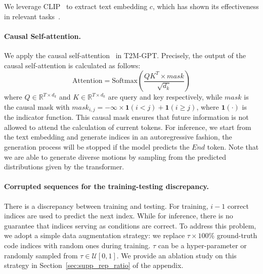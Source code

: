 \documentclass[10pt,twocolumn,letterpaper]{article}
\begin{document}
We leverage CLIP~\cite{radford2021learning} to extract text embedding $c$, which has shown its effectiveness in relevant tasks~\cite{tevet2022motionclip,ramesh2022hierarchical,crowson2022vqgan}. 

\paragraph{Causal Self-attention.} We apply the causal self-attention~\cite{radford2018improving} in T2M-GPT. Precisely, the output of the causal self-attention is calculated as follows:
\begin{equation}
	\text{Attention} = \text{Softmax} \left( \frac{QK^T \times mask}{\sqrt{d_k}} \right)
	\label{formula:causal}
\end{equation}
where $Q \in \mathbb{R}^{T \times d_k}$ and $K \in \mathbb{R}^{T \times d_k}$ are query and key respectively, while $mask$ is the causal mask with $mask_{i,j} = -\infty \times \mathbf{1}\left( i < j\right) + \mathbf{1}\left( i \geq j \right)$, where $\mathbf{1}(\cdot)$ is the indicator function.
This causal mask ensures that future information is not allowed to attend the calculation of current tokens. For inference, we start from the text embedding and generate indices in an autoregressive fashion, the generation process will be stopped if the model predicts the $\mathit{End}$ token. Note that we are able to generate diverse motions by sampling from the predicted distributions given by the transformer.

\paragraph{Corrupted sequences for the training-testing discrepancy.} There is a discrepancy between training and testing. For training, $i-1$ correct indices are used to predict the next index. While for inference, there is no guarantee that indices serving as conditions are correct. To address this problem, we adopt a simple data augmentation strategy:  we replace $\tau\times100\%$ ground-truth code indices with random ones during training. $\tau$ can be a hyper-parameter or randomly sampled from $\tau \in \mathcal{U}[0, 1]$. We provide an ablation study on this strategy in Section~\ref{sec:supp_rep_ratio} of the appendix.  
\end{document}
